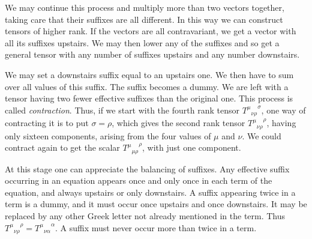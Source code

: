 We may continue this process and multiply more than two vectors together, 
taking care that their suffixes are all different. In this way we can construct 
tensors of higher rank. If the vectors are all contravariant, we get a vector 
with all its suffixes upstairs. We may then lower any of the suffixes and so get 
a general tensor with any number of suffixes upstairs and any number downstairs.

We may set a downstairs suffix equal to an upstairs one. We then have to sum 
over all values of this suffix. The suffix becomes a dummy. We are left with a 
tensor having two fewer effective suffixes than the original one. This process 
is called \emph{contraction}. Thus, if we start with the fourth rank tensor 
${{T^\mu}_{\nu\rho}}^{\sigma}$, one way of contracting it is to put $\sigma = 
\rho$, which gives the second rank tensor ${{T^\mu}_{\nu\rho}}^{\rho}$, 
having only sixteen components, arising from the four values of $\mu$ and $\nu$. 
We could contract again to get the scalar ${{T^\mu}_{\mu\rho}}^{\rho}$, with 
just one component.

At this stage one can appreciate the balancing of suffixes. Any effective 
suffix occurring in an equation appears once and only once in each term of the 
equation, and always upstairs or only downstairs. A suffix appearing twice in a 
term is a dummy, and it must occur once upstairs and once downstairs. It may be 
replaced by any other Greek letter not already mentioned in the term. Thus 
${{T^\mu}_{\nu\rho}}^{\rho} = {{T^\mu}_{\nu\alpha}}^{\alpha}$. A suffix must 
never occur more than twice in a term.
